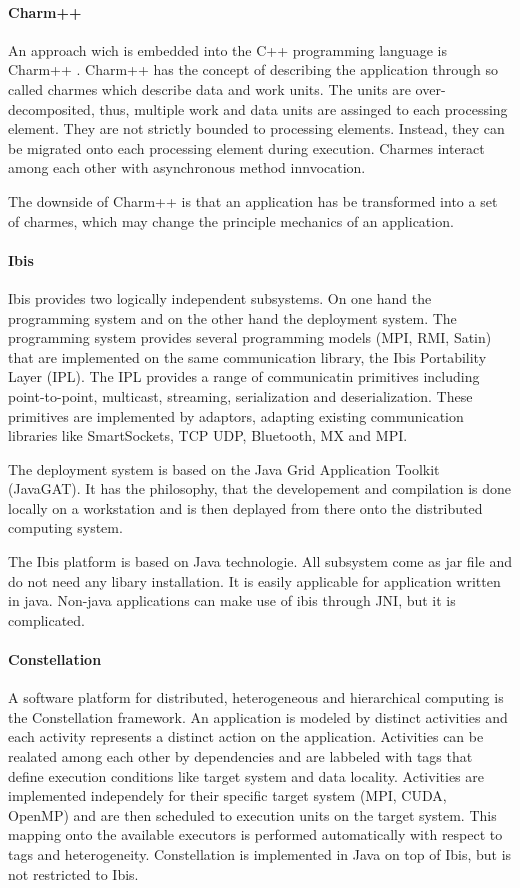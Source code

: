 \paragraph*{Charm++} 
An approach wich is embedded into the C++ programming language is
Charm++ \cite{ref:charm}. Charm++ has the concept of describing the
application through so called charmes which describe data and work
units. The units are over-decomposited, thus, multiple work and data
units are assinged to each processing element. They are not strictly
bounded to processing elements. Instead, they can be migrated onto
each processing element during execution. Charmes interact among each
other with asynchronous method innvocation.

The downside of Charm++ is that an application has be transformed into
a set of charmes, which may change the principle mechanics of an
application.

\paragraph*{Ibis} 
Ibis \cite{ref:ibis} provides two logically independent subsystems.
On one hand the programming system and on the other hand the
deployment system. The programming system provides several programming
models (MPI, RMI, Satin) that are implemented on the same
communication library, the Ibis Portability Layer (IPL).  The IPL
provides a range of communicatin primitives including point-to-point,
multicast, streaming, serialization and deserialization. These
primitives are implemented by adaptors, adapting existing
communication libraries like SmartSockets, TCP UDP, Bluetooth, MX and
MPI.

The deployment system is based on the Java Grid Application Toolkit
(JavaGAT).  It has the philosophy, that the developement and
compilation is done locally on a workstation and is then deplayed from
there onto the distributed computing system.

The Ibis platform is based on Java technologie. All subsystem come as
jar file and do not need any libary installation. It is easily
applicable for application written in java. Non-java applications can
make use of ibis through JNI, but it is complicated.

\paragraph*{Constellation}
A software platform for distributed, heterogeneous and hierarchical
computing is the Constellation \cite{ref:constellation} framework. An
application is modeled by distinct activities and each activity
represents a distinct action on the application.  Activities can be
realated among each other by dependencies and are labbeled with tags
that define execution conditions like target system and data locality.
Activities are implemented independely for their specific target
system (MPI, CUDA, OpenMP) and are then scheduled to execution units
on the target system. This mapping onto the available executors is
performed automatically with respect to tags and
heterogeneity. Constellation is implemented in Java on top of Ibis,
but is not restricted to Ibis.

